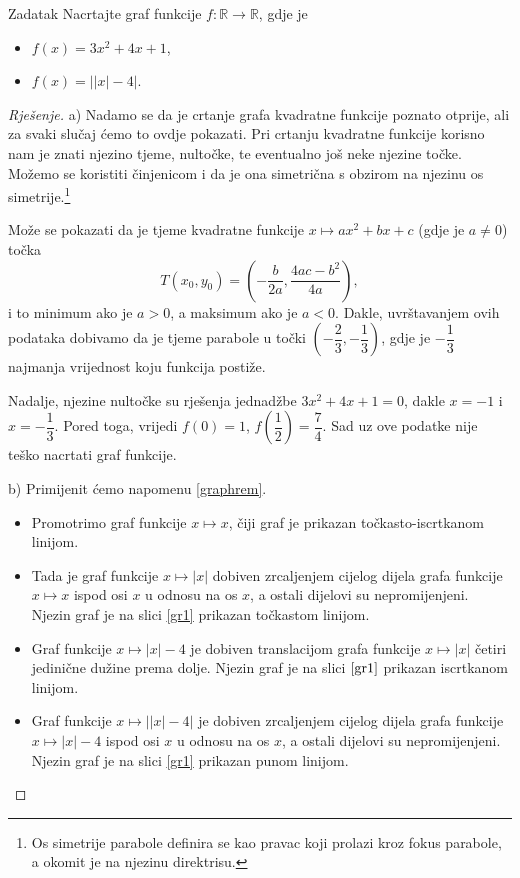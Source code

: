 \begin{exercise}{Zadatak}
\label{exgraph1}
Nacrtajte graf funkcije \(f: \mathbb{R}\to \mathbb{R}\), gdje je
\begin{itemize}
\item[a)] \(f(x)=3x^2+4x+1\), 
\item[b)] \(f(x)=\left\lvert \left\lvert x\right\rvert-4\right\rvert\).
\end{itemize}
\end{exercise}
\begin{proof}[Rješenje] a) Nadamo se da je crtanje grafa kvadratne funkcije poznato otprije, ali za svaki slučaj ćemo to ovdje pokazati. Pri crtanju kvadratne funkcije korisno nam je znati njezino tjeme, nultočke, te eventualno još neke njezine točke. Možemo se koristiti činjenicom i da je ona simetrična s obzirom na njezinu os simetrije.\footnote{Os simetrije parabole definira se kao pravac koji prolazi kroz fokus parabole, a okomit je na njezinu direktrisu.} 

Može se pokazati da je tjeme kvadratne funkcije \(x\mapsto ax^2+bx+c\) (gdje je \(a\neq 0\)) točka
\[T(x_0, y_0)=\left(-\dfrac{b}{2a}, \dfrac{4ac-b^2}{4a}\right),\]
i to minimum ako je \(a>0\), a maksimum ako je \(a<0\). Dakle, uvrštavanjem ovih podataka dobivamo da je tjeme parabole u točki \(\left(-\dfrac{2}{3}, -\dfrac{1}{3}\right)\), gdje je \(-\dfrac{1}{3}\) najmanja vrijednost koju funkcija postiže.

Nadalje, njezine nultočke su rješenja jednadžbe \(3x^2+4x+1=0\), dakle \(x=-1\) i \(x=-\dfrac{1}{3}\). Pored toga, vrijedi \(f(0)=1\), \(f\left(\dfrac{1}{2}\right)=\dfrac{7}{4}\). Sad uz ove podatke nije teško nacrtati graf funkcije.

b) Primijenit ćemo napomenu \ref{graphrem}.
\begin{itemize}
\item Promotrimo graf funkcije \(x\mapsto x\), čiji graf je prikazan točkasto-iscrtkanom linijom.
\item Tada je graf funkcije \(x\mapsto |x|\) dobiven zrcaljenjem cijelog dijela grafa funkcije \(x\mapsto x\) ispod osi \(x\) u odnosu na os \(x\), a ostali dijelovi su nepromijenjeni. Njezin graf je na slici \ref{gr1} prikazan točkastom linijom.
\item Graf funkcije \(x\mapsto |x|-4\) je dobiven translacijom grafa funkcije \(x\mapsto |x|\) četiri jedinične dužine prema dolje. Njezin graf je na slici \(\ref{gr1}\) prikazan iscrtkanom linijom.
\item Graf funkcije \(x\mapsto \left\lvert \left\lvert x\right\rvert-4\right\rvert\) je dobiven zrcaljenjem cijelog dijela grafa funkcije \(x\mapsto |x|-4\) ispod osi \(x\) u odnosu na os \(x\), a ostali dijelovi su nepromijenjeni. Njezin graf je na slici \ref{gr1} prikazan punom linijom. \qedhere
\end{itemize}
\end{proof}
